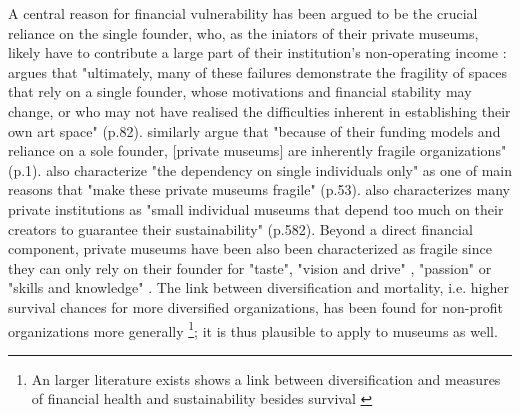 \documentclass[12pt]{article}
\begin{document}
A central reason for financial vulnerability has been argued to be the crucial reliance on the single founder, who, as the iniators of their private museums, likely have to contribute a large part of their institution's non-operating income \parencite{Frey_Meier_2002_beyeler}:
\textcite{Adam_2021_rise} argues that "ultimately, many of these failures demonstrate the fragility of spaces that rely on a single founder, whose motivations and financial stability may change, or who may not have realised the difficulties inherent in establishing their own art space" (p.82).
\textcite{Velthuis_Gera_2024_fragility} similarly argue that "because of their funding models and reliance on a sole founder, [private museums] are inherently fragile organizations" (p.1).
\textcite{Bechtler_Imhof_2018_future} also characterize "the dependency on single individuals only" as one of main reasons that "make these private museums fragile" (p.53).
\cite{StylianouLambert_etal_2014_museums} also characterizes many private institutions as "small individual museums that depend too much on their creators to guarantee their sustainability" (p.582).
Beyond a direct financial component, private museums have been also been characterized as fragile since they can only rely on their founder for "taste", "vision and drive" \parencite[p.77]{Adam_2021_rise}, "passion" \parencite[p.234]{Walker_2019_collector} or "skills and knowledge" \parencite[p.580]{StylianouLambert_etal_2014_museums}.
The link between diversification and mortality, i.e. higher survival chances for more diversified organizations, has been found for non-profit organizations more generally \parencite{Fernandez_2007_dissolution,Bielefeld_1994_survival,Hager_2001_vulnerability,Lu_Shon_Zhang_2019_dissolution}\footnote{An larger literature exists shows a link between diversification and measures of financial health and sustainability besides survival \parencite{Licci_BaraldiBonini_2024_sustainability}}; it is thus plausible to apply to museums as well.
\end{document}
